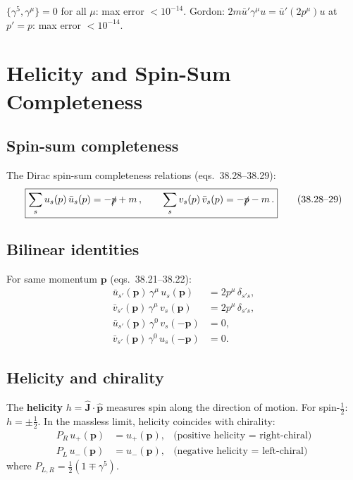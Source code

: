 \documentclass[12pt]{article}
\newcommand{\verified}[1]{\textcolor{verifygreen}{\checkmark\; #1}}
\begin{document}
\verified{$\{\gamma^5,\gamma^\mu\}=0$ for all $\mu$: max error $<10^{-14}$.}
\verified{Gordon: $2m\bar u'\gamma^\mu u = \bar u'(2p^\mu)u$ at $p'=p$: max error $<10^{-14}$.}

\section{Helicity and Spin-Sum Completeness}

\subsection{Spin-sum completeness}

The Dirac spin-sum completeness relations (eqs.~38.28--38.29):
\begin{equation}
  \boxed{
    \sum_s u_s(p)\,\bar u_s(p) = -\slashed{p} + m\,,
    \qquad
    \sum_s v_s(p)\,\bar v_s(p) = -\slashed{p} - m\,.
  }
  \tag{38.28--29}
\end{equation}

\subsection{Bilinear identities}

For same momentum $\mathbf{p}$ (eqs.~38.21--38.22):
\begin{align}
  \bar u_{s'}(\mathbf{p})\,\gamma^\mu\,u_s(\mathbf{p})
    &= 2p^\mu\,\delta_{s's}, \tag{38.21a}\\
  \bar v_{s'}(\mathbf{p})\,\gamma^\mu\,v_s(\mathbf{p})
    &= 2p^\mu\,\delta_{s's}, \tag{38.21b}\\
  \bar u_{s'}(\mathbf{p})\,\gamma^0\,v_s(-\mathbf{p})
    &= 0, \tag{38.22a}\\
  \bar v_{s'}(\mathbf{p})\,\gamma^0\,u_s(-\mathbf{p})
    &= 0. \tag{38.22b}
\end{align}

\subsection{Helicity and chirality}

The \textbf{helicity} $h = \hat{\mathbf{J}}\cdot\hat{\mathbf{p}}$ measures spin
along the direction of motion.  For spin-$\tfrac{1}{2}$: $h = \pm\tfrac{1}{2}$.
In the massless limit, helicity coincides with chirality:
\begin{align}
  P_R\,u_+(\mathbf{p}) &= u_+(\mathbf{p}), & \text{(positive helicity = right-chiral)}\\
  P_L\,u_-(\mathbf{p}) &= u_-(\mathbf{p}), & \text{(negative helicity = left-chiral)}
\end{align}
where $P_{L,R} = \tfrac{1}{2}(1\mp\gamma^5)$.
\end{document}
